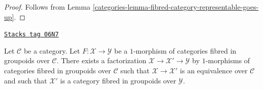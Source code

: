 \begin{proof}

Follows from
Lemma \ref{categories-lemma-fibred-category-representable-goes-up}.
\end{proof}

\begin{lemma}
\label{categories-lemma-ameliorate-morphism-categories-fibred-groupoids}
\href{https://stacks.math.columbia.edu/tag/06N7}{\texttt{Stacks tag 06N7}}

Let $\mathcal{C}$ be a category. Let $F : \mathcal{X} \to \mathcal{Y}$
be a $1$-morphism of categories fibred in groupoids over $\mathcal{C}$.
There exists a factorization $\mathcal{X} \to \mathcal{X}' \to \mathcal{Y}$
by $1$-morphisms of categories fibred in groupoids over $\mathcal{C}$ such
that $\mathcal{X} \to \mathcal{X}'$ is an equivalence over $\mathcal{C}$
and such that $\mathcal{X}'$ is a category fibred in groupoids over
$\mathcal{Y}$.
\end{lemma}

